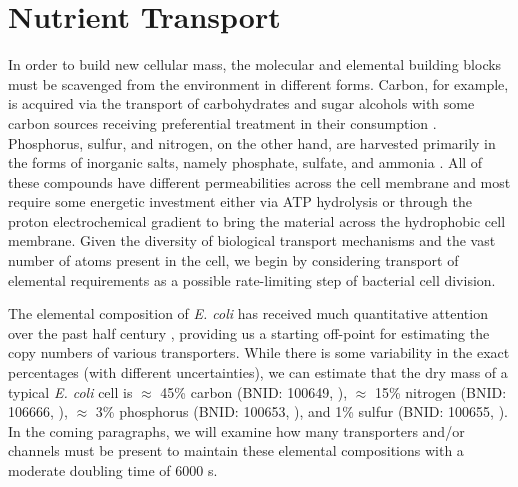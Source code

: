 \section{Nutrient Transport}
In order to build new cellular mass, the molecular and elemental building
blocks must be scavenged from the environment in different forms. Carbon, for
example, is acquired via the transport of carbohydrates and sugar alcohols
with some carbon sources receiving preferential treatment in their
consumption \citep{monod1947}. Phosphorus, sulfur, and nitrogen, on the other
hand, are harvested primarily in the forms of inorganic salts, namely
phosphate, sulfate, and ammonia \citep{jun2018, assentoft2016, stasi2019,
antonenko1997, rosenberg1977, willsky1973}. All of these compounds have
different permeabilities across the cell membrane and most require some
energetic investment either via ATP hydrolysis or through the proton
electrochemical gradient to bring the material across the hydrophobic cell
membrane. Given the diversity of biological transport mechanisms and the vast
number of atoms present in the cell, we begin by considering transport of
elemental requirements as a possible rate-limiting step of bacterial cell
division.

The elemental composition of \textit{E. coli} has received much quantitative
attention over the past half century \citep{neidhardt1991, taymaz-nikerel2010,
heldal1985, bauer1976}, providing us a starting off-point for estimating the
copy numbers of various transporters. While there is some variability in the
exact percentages (with different uncertainties), we can estimate that the
dry mass of a typical \textit{E. coli} cell is $\approx$ 45\% carbon (BNID:
100649, \cite{milo2010}), $\approx$ 15\% nitrogen (BNID: 106666,
\cite{milo2010}), $\approx$ 3\% phosphorus (BNID: 100653, \cite{milo2010}), and
1\% sulfur (BNID: 100655, \cite{milo2010}). In the coming paragraphs, we will examine how many transporters and/or channels 
must be present to maintain these elemental compositions with a moderate
doubling time of 6000 s.

